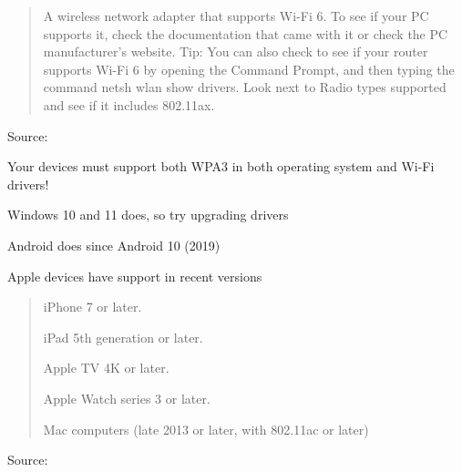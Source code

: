 \documentclass[Screen16to9,17pt]{foils}
\begin{document}


\begin{quote}
A wireless network adapter that supports Wi-Fi 6. To see if your PC supports it, check the documentation that came with it or check the PC manufacturer’s website.
Tip: You can also check to see if your router supports Wi-Fi 6 by opening the Command Prompt, and then typing the command netsh wlan show drivers. Look next to Radio types supported and see if it includes 802.11ax.
\end{quote}
Source: 

\begin{list2}
\item Your devices must support both WPA3 in both operating system and Wi-Fi drivers!
\item Windows 10 and 11 does, so try upgrading drivers
\item Android does since Android 10 (2019)
\item Apple devices have support in recent versions
\end{list2}




\begin{quote}
\begin{list2}
\item iPhone 7 or later.
\item iPad 5th generation or later.
\item Apple TV 4K or later.
\item Apple Watch series 3 or later.
\item Mac computers (late 2013 or later, with 802.11ac or later)
\end{list2}
\end{quote}
Source: 



\end{document}
